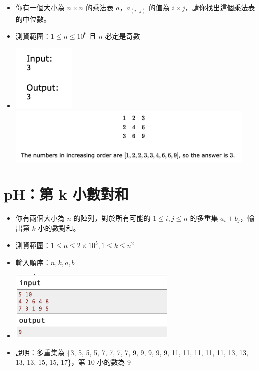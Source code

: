 \documentclass[12pt]{article}
\begin{document}
\begin{itemize}[label={}, itemsep=0pt]
    \item 你有一個大小為 $n \times n$ 的乘法表 $a$，$a_{(i,\ j)}$ 的值為 $i \times j$，請你找出這個乘法表的中位數。
    \item 測資範圍：$1 \leq n \leq 10^6$ 且 $n$ 必定是奇數
    \item \includegraphics[width=3.0cm]{img/pG-2.png}\includegraphics[width=12.0cm]{img/pG-1.png}
\end{itemize}

\section*{pH：第 k 小數對和}

\begin{itemize}[label={}, itemsep=0pt]
    \item 你有兩個大小為 $n$ 的陣列，對於所有可能的 $1 \leq i, j \leq n$ 的多重集 $a_i+b_j$，輸出第 $k$ 小的數對和。
    \item 測資範圍：$1 \leq n \leq 2 \times 10^5, 1 \leq k \leq n^2$
    \item 輸入順序：$n, k, a, b$
    \item \includegraphics[width=8.0cm]{img/pH.png}
    \item 說明：多重集為 \{3, 5, 5, 5, 7, 7, 7, 7, 9, 9, 9, 9, 9, 11, 11, 11, 11, 11, 13, 13, 13, 13, 15, 15, 17\}，第 10 小的數為 9
\end{itemize}
\end{document}
